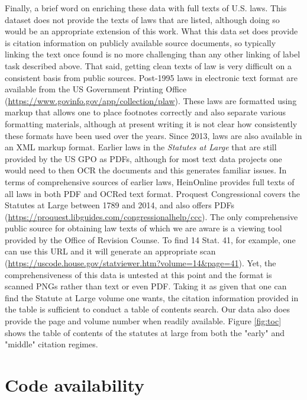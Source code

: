 \documentclass[fleqn,10pt]{wlscirep}
\begin{document}
Finally, a brief word on enriching these data with full texts of U.S. laws. This dataset does not provide the texts of laws that are listed, although doing so would be an appropriate extension of this work. What this data set does provide is citation information on publicly available source documents, so typically linking the text once found is no more challenging than any other linking of label task described above. That said, getting clean texts of law is very difficult on a consistent basis from public sources. Post-1995 laws in electronic text format are available from the US Government Printing Office (\url{https://www.govinfo.gov/app/collection/plaw}). These laws are formatted using markup that allows one to place footnotes correctly and also separate various formatting materials, although at present writing it is not clear how consistently these formats have been used over the years. Since 2013, laws are also available in an XML markup format. Earlier laws in the \textit{Statutes at Large} that are still provided by the US GPO as PDFs, although for most text data projects one would need to then OCR the documents and this generates familiar issues. In terms of comprehensive sources of earlier laws, HeinOnline provides full texts of all laws in both PDF and OCRed text format. Proquest Congressional covers the Statutes at Large between 1789 and 2014, and also offers PDFs (\url{https://proquest.libguides.com/congressionalhelp/ccc}). The only comprehensive public source for obtaining law texts of which we are aware is a viewing tool provided by the Office of Revision Counse. To find 14 Stat. 41, for example, one can use this URL and it will generate an appropriate scan (\url{https://uscode.house.gov/statviewer.htm?volume=14&page=41}). Yet, the comprehensiveness of this data is untested at this point and the format is scanned PNGs rather than text or even PDF. Taking it as given that one can find the Statute at Large volume one wants, the citation information provided in the table is sufficient to conduct a table of contents search. Our data also does provide the page and volume number when readily available. Figure \ref{fig:toc} shows the table of contents of the statutes at large from both the "early" and "middle" citation regimes.



\nocite{libgober_dataset}




\section*{Code availability}
\end{document}

